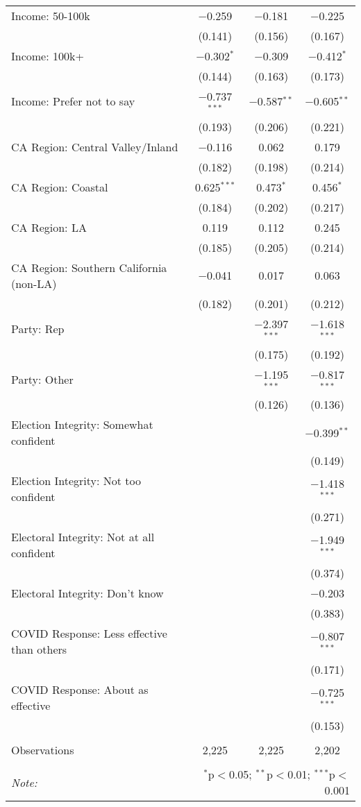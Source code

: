 \begin{table}[!htbp]
\begin{tabular}{@{\extracolsep{5pt}}lccc}
  Income: 50-100k & $-$0.259 & $-$0.181 & $-$0.225 \\ 
  & (0.141) & (0.156) & (0.167) \\ 
  Income: 100k+ & $-$0.302$^{*}$ & $-$0.309 & $-$0.412$^{*}$ \\ 
  & (0.144) & (0.163) & (0.173) \\ 
  Income: Prefer not to say & $-$0.737$^{***}$ & $-$0.587$^{**}$ & $-$0.605$^{**}$ \\ 
  & (0.193) & (0.206) & (0.221) \\ 
  CA Region: Central Valley/Inland & $-$0.116 & 0.062 & 0.179 \\ 
  & (0.182) & (0.198) & (0.214) \\ 
  CA Region: Coastal & 0.625$^{***}$ & 0.473$^{*}$ & 0.456$^{*}$ \\ 
  & (0.184) & (0.202) & (0.217) \\ 
  CA Region: LA & 0.119 & 0.112 & 0.245 \\ 
  & (0.185) & (0.205) & (0.214) \\ 
  CA Region: Southern California (non-LA) & $-$0.041 & 0.017 & 0.063 \\ 
  & (0.182) & (0.201) & (0.212) \\ 
  Party: Rep &  & $-$2.397$^{***}$ & $-$1.618$^{***}$ \\ 
  &  & (0.175) & (0.192) \\ 
  Party: Other &  & $-$1.195$^{***}$ & $-$0.817$^{***}$ \\ 
  &  & (0.126) & (0.136) \\ 
  Election Integrity: Somewhat confident &  &  & $-$0.399$^{**}$ \\ 
  &  &  & (0.149) \\ 
  Election Integrity: Not too confident &  &  & $-$1.418$^{***}$ \\ 
  &  &  & (0.271) \\ 
  Electoral Integrity: Not at all confident &  &  & $-$1.949$^{***}$ \\ 
  &  &  & (0.374) \\ 
  Electoral Integrity: Don't know &  &  & $-$0.203 \\ 
  &  &  & (0.383) \\ 
  COVID Response: Less effective than others &  &  & $-$0.807$^{***}$ \\ 
  &  &  & (0.171) \\ 
  COVID Response: About as effective &  &  & $-$0.725$^{***}$ \\ 
  &  &  & (0.153) \\ 
 \hline \\[-1.8ex] 
Observations & 2,225 & 2,225 & 2,202 \\ 
\hline 
\hline \\[-1.8ex] 
\textit{Note:}  & \multicolumn{3}{r}{$^{*}$p$<$0.05; $^{**}$p$<$0.01; $^{***}$p$<$0.001} \\ 
\end{tabular} 
\end{table} 
